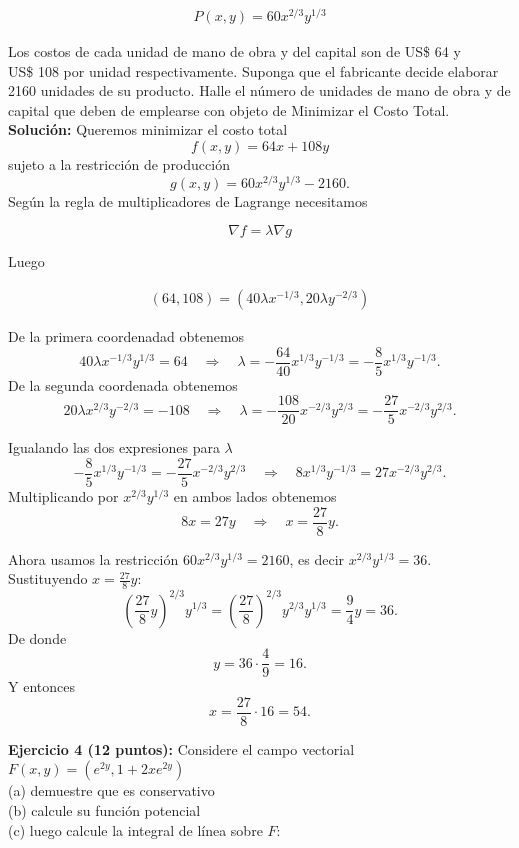 \documentclass[a4paper]{article}
\begin{document}
\begin{align*}
    P(x,y) = 60x^{2/3}y^{1/3}
\end{align*}

Los costos de cada unidad de mano de obra y del capital son de US\$ 64 y \\US\$ 108 por unidad respectivamente. Suponga que el fabricante decide elaborar 2160 unidades de su producto. Halle el número de unidades de mano de obra y de capital que deben de emplearse con objeto de Minimizar el Costo Total. \\

\textbf{Solución: } Queremos minimizar el costo total
\[
f(x,y)=64x+108y
\]
sujeto a la restricción de producción
\[
g(x,y) =60x^{2/3}y^{1/3}-2160.
\]
Según la regla de multiplicadores de Lagrange necesitamos

\[
\nabla f = \lambda \nabla g
\]

Luego 

\begin{align*}
    (64,108) = (40\lambda x^{-1/3}, 20\lambda y^{-2/3})
\end{align*}

De la primera coordenadad obtenemos
\[
40\lambda x^{-1/3}y^{1/3}=64
\quad\Rightarrow\quad
\lambda=-\frac{64}{40}x^{1/3}y^{-1/3}=-\frac{8}{5}x^{1/3}y^{-1/3}.
\]
De la segunda coordenada obtenemos
\[
20\lambda x^{2/3}y^{-2/3}=-108
\quad\Rightarrow\quad
\lambda=-\frac{108}{20}x^{-2/3}y^{2/3}=-\frac{27}{5}x^{-2/3}y^{2/3}.
\]

Igualando las dos expresiones para \(\lambda\)
\[
-\frac{8}{5}x^{1/3}y^{-1/3}=-\frac{27}{5}x^{-2/3}y^{2/3}
\quad\Longrightarrow\quad
8x^{1/3}y^{-1/3}=27x^{-2/3}y^{2/3}.
\]
Multiplicando por \(x^{2/3}y^{1/3}\) en ambos lados obtenemos
\[
8x=27y
\quad\Rightarrow\quad
x=\frac{27}{8}y.
\]

Ahora usamos la restricción \(60x^{2/3}y^{1/3}=2160\), es decir \(x^{2/3}y^{1/3}=36\). Sustituyendo \(x=\tfrac{27}{8}y\):
\[
\left(\frac{27}{8}y\right)^{2/3}y^{1/3}
=\left(\frac{27}{8}\right)^{2/3}y^{2/3}y^{1/3}
=\frac{9}{4}y =36.
\]
De donde
\[
y = 36\cdot\frac{4}{9}=16.
\]
Y entonces
\[
x=\frac{27}{8}\cdot 16 =54.
\]


\newpage



\textbf{Ejercicio 4 (12 puntos):} Considere el campo vectorial $F(x,y) = (e^{2y}, 1+2xe^{2y})$ \\



(a) demuestre que es conservativo \\
(b) calcule su función potencial \\ 
(c) luego calcule la integral de línea sobre $F$: \\
\end{document}

